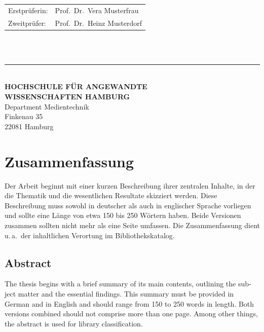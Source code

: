 \begin{titlepage}
  \vspace{5cm}

  \hspace*{37mm}
  \begin{minipage}{0.5\linewidth}
    \begin{tabular}{@{}ll}
      Erstprüferin: & Prof.\ Dr.\ Vera Musterfrau\\[-.3mm]
      Zweitprüfer: & Prof.\ Dr.\ Heinz Musterdorf \\
    \end{tabular}\\

    \,\rule{9mm}{1mm}\\[1.5mm]

    \textbf{HOCHSCHULE FÜR ANGEWANDTE}\\
    \textbf{WISSENSCHAFTEN HAMBURG}\\
    Department Medientechnik\\
    Finkenau 35\\
    22081 Hamburg
  \end{minipage}
\end{titlepage}
\restoregeometry{}

\thispagestyle{empty}

\section*{Zusammenfassung}

Der Arbeit beginnt mit einer kurzen Beschreibung ihrer zentralen Inhalte, in
der die Thematik und die wesentlichen Resultate skizziert werden.  Diese
Beschreibung muss sowohl in deutscher als auch in englischer Sprache vorliegen
und sollte eine Länge von etwa 150 bis 250 Wörtern haben.  Beide Versionen
zusammen sollten nicht mehr als eine Seite umfassen.  Die Zusammenfassung
dient u.\,a.\ der inhaltlichen Verortung im Bibliothekskatalog.

{
  \begin{otherlanguage}{english}
    \section*{Abstract}

    The thesis begins with a brief summary of its main contents, outlining the
    subject matter and the essential findings.  This summary must be provided
    in German and in English and should range from 150 to 250 words in length.
    Both versions combined should not comprise more than one page.  Among
    other things, the abstract is used for library classification.
  \end{otherlanguage}
}
